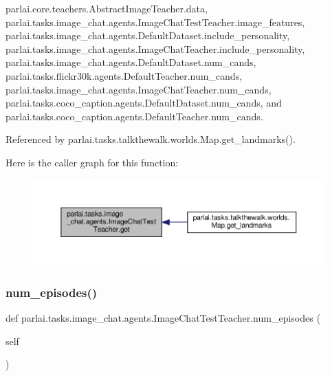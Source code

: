 parlai.\+core.\+teachers.\+Abstract\+Image\+Teacher.\+data, parlai.\+tasks.\+image\+\_\+chat.\+agents.\+Image\+Chat\+Test\+Teacher.\+image\+\_\+features, parlai.\+tasks.\+image\+\_\+chat.\+agents.\+Default\+Dataset.\+include\+\_\+personality, parlai.\+tasks.\+image\+\_\+chat.\+agents.\+Image\+Chat\+Teacher.\+include\+\_\+personality, parlai.\+tasks.\+image\+\_\+chat.\+agents.\+Default\+Dataset.\+num\+\_\+cands, parlai.\+tasks.\+flickr30k.\+agents.\+Default\+Teacher.\+num\+\_\+cands, parlai.\+tasks.\+image\+\_\+chat.\+agents.\+Image\+Chat\+Teacher.\+num\+\_\+cands, parlai.\+tasks.\+coco\+\_\+caption.\+agents.\+Default\+Dataset.\+num\+\_\+cands, and parlai.\+tasks.\+coco\+\_\+caption.\+agents.\+Default\+Teacher.\+num\+\_\+cands.



Referenced by parlai.\+tasks.\+talkthewalk.\+worlds.\+Map.\+get\+\_\+landmarks().

Here is the caller graph for this function\+:
\nopagebreak
\begin{figure}[H]
\begin{center}
\leavevmode
\includegraphics[width=350pt]{classparlai_1_1tasks_1_1image__chat_1_1agents_1_1ImageChatTestTeacher_a62eff78b8f32b86c39804a644c3337f6_icgraph}
\end{center}
\end{figure}
\mbox{\label{classparlai_1_1tasks_1_1image__chat_1_1agents_1_1ImageChatTestTeacher_a538e34213530b244b4cc4e8c90de7af2}} 
\subsubsection{\texorpdfstring{num\+\_\+episodes()}{num\_episodes()}}
{\footnotesize\ttfamily def parlai.\+tasks.\+image\+\_\+chat.\+agents.\+Image\+Chat\+Test\+Teacher.\+num\+\_\+episodes (\begin{DoxyParamCaption}\item[{}]{self }\end{DoxyParamCaption})}

